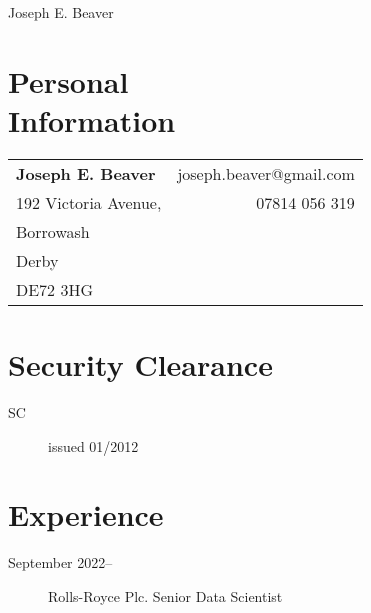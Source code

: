 \documentclass[margin,line]{resume}
\begin{document}
{\sc \Large Joseph E. Beaver}

\begin{resume}

	\section{\mysidestyle Personal\\ Information}\vspace{1em}
	\hspace{-0.5em}\begin{tabular}[t]{p{} r}
		\textbf{Joseph E. Beaver} & joseph.beaver@gmail.com \\
		192 Victoria Avenue,      & 07814 056 319           \\
		Borrowash                 &                         \\
		Derby                     &                         \\
		DE72 3HG                  &
	\end{tabular}

	\section{\mysidestyle Security Clearance}
	\begin{description}
		\item[SC] issued 01/2012
	\end{description}

	\section{\mysidestyle Experience}\vspace{1mm}

	\begin{description}

		\item[September 2022--] Rolls-Royce Plc. Senior Data Scientist


\end{description}
\end{resume}
\end{document}

